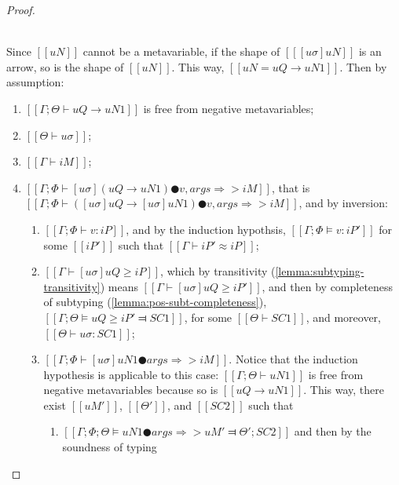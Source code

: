 \begin{proof}
\begin{caseof}
        \item {}\\
            Since $[[uN]]$ cannot be a metavariable,  
            if the shape of $[[ [uσ]uN ]]$ is an arrow, 
            so is the shape of $[[uN]]$. This way, 
            $[[uN = uQ → uN1]]$.
            Then by assumption:
            \begin{enumerate}
                \item $[[Γ; Θ ⊢ uQ → uN1]]$ is free from negative metavariables;
                \item $[[Θ ⊢ uσ]]$;
                \item $[[Γ ⊢ iM]]$;
                \item $[[Γ; Φ ⊢ [uσ](uQ → uN1) ● v, args ⇒> iM]]$, 
                    \label{point:typing-completeness-arrow-app-inversion}
                    that is $[[Γ; Φ ⊢ ([uσ]uQ → [uσ]uN1) ● v, args ⇒> iM]]$,
                    and by inversion:
                    \begin{enumerate}
                        \item $[[Γ; Φ ⊢ v : iP]]$,
                            and by the induction hypothsis, 
                            $[[Γ; Φ ⊨ v : iP']]$ for some $[[iP']]$
                            such that $[[Γ ⊢ iP' ≈ iP]]$;
                        \item $[[Γ ⊢ [uσ]uQ ≥ iP]]$, 
                            which by transitivity (\cref{lemma:subtyping-transitivity}) means 
                            $[[Γ ⊢ [uσ]uQ ≥ iP']]$,
                            and then by completeness of subtyping 
                            (\cref{lemma:pos-subt-completeness}),
                            $[[ Γ; Θ ⊨ uQ ≥ iP' ⫤ SC1 ]]$, 
                            for some $[[Θ ⊢ SC1]]$, and moreover, $[[Θ ⊢ uσ : SC1]]$;
                        \item $[[Γ; Φ ⊢ [uσ]uN1 ● args ⇒> iM]]$. 
                            \label{point:completeness-arrow-app-ih}
                            Notice that the induction hypothesis is applicable to this case:
                            $[[Γ ; Θ ⊢ uN1]]$ is free from negative metavariables because
                            so is $[[uQ → uN1]]$. This way, there exist 
                            $[[uM']]$, $[[Θ']]$, and $[[SC2]]$ such that 
                            \begin{enumerate}
                                \item $[[ Γ; Φ; Θ ⊨ uN1 ● args ⇒> uM' ⫤ Θ'; SC2 ]]$
                                    and then by the soundness of typing 

\end{enumerate}
\end{enumerate}
\end{enumerate}
\end{caseof}
\end{proof}
